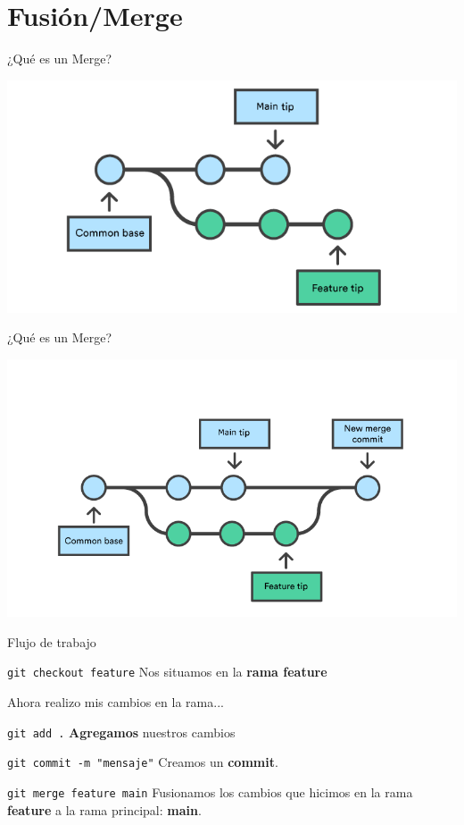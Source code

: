 \documentclass{beamer}
\begin{document}
    \section{Fusión/Merge}
    \begin{frame}{¿Qué es un Merge?}
        \begin{center}
            \includegraphics[width=\textwidth]{01 Branch-2 kopiera.png}
        \end{center}
    \end{frame}
    \begin{frame}{¿Qué es un Merge?}
        \begin{center}
            \includegraphics[width=\textwidth]{02 Branch-1 kopiera.png}
        \end{center}
    \end{frame}
    \begin{frame}{Flujo de trabajo}
        \begin{block}{\texttt{git checkout feature}}
            Nos situamos en la \textbf{rama feature}
        \end{block}\pause
        Ahora realizo mis cambios en la rama...\pause
        \begin{block}{\texttt{git add .}}
            \textbf{Agregamos} nuestros cambios
        \end{block}\pause
        \begin{block}{\texttt{git commit -m "mensaje"}}
            Creamos un \textbf{commit}.
        \end{block}\pause
        \begin{block}{\texttt{git merge feature main}}
            Fusionamos los cambios que hicimos en la rama \textbf{feature} a la rama principal: \textbf{main}.
        \end{block}
    \end{frame}
    
\end{document}

